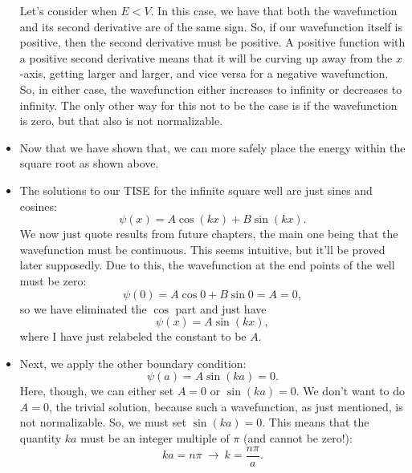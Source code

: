 \begin{itemize}
\begin{equation*}
        \end{equation*}
        Let's consider when $E<V$. In this case, we have that both the wavefunction and its second derivative are of the same sign. So, if our wavefunction itself is positive, then the second derivative must be positive. A positive function with a positive second derivative means that it will be curving up away from the $x$-axis, getting larger and larger, and vice versa for a negative wavefunction. So, in either case, the wavefunction either increases to infinity or decreases to infinity. The only other way for this not to be the case is if the wavefunction is zero, but that also is not normalizable.
    \item Now that we have shown that, we can more safely place the energy within the square root as shown above.
    \item The solutions to our TISE for the infinite square well are just sines and cosines:
        \begin{equation*}
            \psi(x) = A\cos(kx) + B\sin(kx).
        \end{equation*}
        We now just quote results from future chapters, the main one being that the wavefunction must be continuous. This seems intuitive, but it'll be proved later supposedly. Due to this, the wavefunction at the end points of the well must be zero:
        \begin{equation*}
            \psi(0) = A\cos0 + B\sin0 = A = 0,
        \end{equation*}
        so we have eliminated the $\cos$ part and just have
        \begin{equation*}
            \psi(x) = A\sin(kx),
        \end{equation*}
        where I have just relabeled the constant to be $A$.
    \item Next, we apply the other boundary condition:
        \begin{equation*}
            \psi(a) = A\sin(ka) = 0.
        \end{equation*}
        Here, though, we can either set $A=0$ or $\sin(ka)=0$. We don't want to do $A=0$, the trivial solution, because such a wavefunction, as just mentioned, is not normalizable. So, we must set $\sin(ka)=0$. This means that the quantity $ka$ must be an integer multiple of $\pi$ (and cannot be zero!):
        \begin{equation*}
            ka = n\pi \ \rightarrow\ k = \frac{n\pi}{a}.
        \end{equation*}

\end{itemize}
